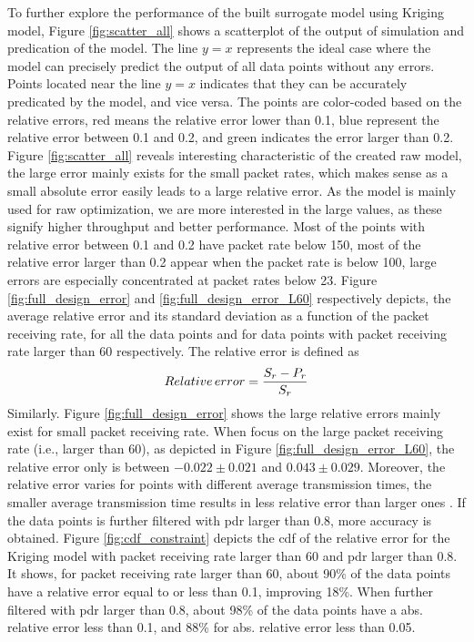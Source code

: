 To further explore the performance of the built surrogate model using Kriging model, Figure \ref{fig:scatter_all}  shows a scatterplot of the output of simulation and predication of the model.
The line  $y=x$ represents the ideal case where the model can precisely predict the output of all data points without any errors. Points located near the line $y=x$ indicates that they can be accurately predicated by the model, and vice versa. The points are color-coded based on the relative errors, red means the relative error lower than 0.1, blue represent the relative error between 0.1 and 0.2, and green indicates the error larger than 0.2. Figure \ref{fig:scatter_all} reveals interesting characteristic of the created \gls{raw} model, the large error mainly exists for the small packet rates, which makes sense as a small absolute error easily leads to a large relative error. As the model is mainly used for \gls{raw} optimization, we are more interested in the large values, as these signify higher throughput and better performance. Most of the points with relative error between 0.1 and 0.2 have packet rate below 150, most of the relative error larger than 0.2 appear when the packet rate is below 100, large errors are especially concentrated at packet rates below 23. Figure \ref{fig:full_design_error} and \ref{fig:full_design_error_L60} respectively depicts, the average relative error and its standard deviation as a function of the packet receiving rate, for all the data points and for data points with packet receiving rate larger than 60 respectively. The relative error is defined as 
\begin{equation}
Relative \thinspace error = \frac{{S_r - P_r} }{S_r} 
\end{equation}
Similarly. Figure \ref{fig:full_design_error} shows the large relative errors mainly exist for small packet receiving rate. When focus on the large packet receiving rate (i.e., larger than 60), as depicted in Figure \ref{fig:full_design_error_L60}, the relative error only is between $-0.022 \pm 0.021$ and $0.043 \pm  0.029$. Moreover, the relative error varies for points with different average transmission times, the smaller average transmission time results in less relative error than larger ones . If the data points is further filtered with \gls{pdr} larger than 0.8, more accuracy is obtained. Figure \ref{fig:cdf_constraint} depicts the  \gls{cdf} of the relative error for the Kriging model with packet receiving rate larger than 60 and \gls{pdr} larger than 0.8. It shows, for packet receiving rate larger than 60, about 90\% of the data points have a relative error equal to or less than 0.1, improving 18\%. When further filtered with \gls{pdr} larger than 0.8, about 98\% of the data points have a abs. relative error less than 0.1, and 88\% for abs. relative error less than 0.05.



